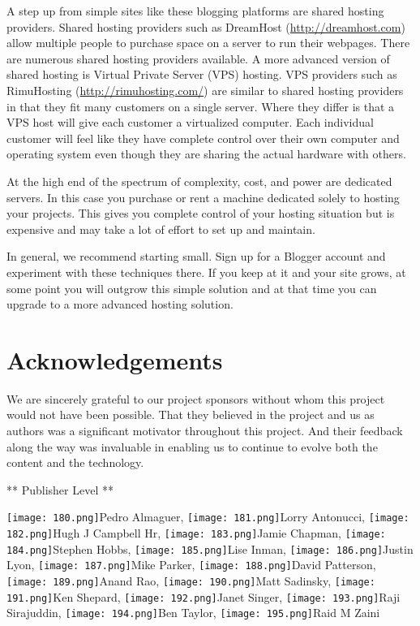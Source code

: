 \documentclass[]{memoir}
\let\Oldincludegraphics\includegraphics
\renewcommand{\includegraphics}[1]{\Oldincludegraphics[max size={\textwidth}{\textheight}]{#1}}
\begin{document}
A step up from simple sites like these blogging platforms are shared
hosting providers. Shared hosting providers such as DreamHost
(\url{http://dreamhost.com}) allow multiple people to purchase space on
a server to run their webpages. There are numerous shared hosting
providers available. A more advanced version of shared hosting is
Virtual Private Server (VPS) hosting. VPS providers such as RimuHosting
(\url{http://rimuhosting.com/}) are similar to shared hosting providers
in that they fit many customers on a single server. Where they differ is
that a VPS host will give each customer a virtualized computer. Each
individual customer will feel like they have complete control over their
own computer and operating system even though they are sharing the
actual hardware with others.

At the high end of the spectrum of complexity, cost, and power are
dedicated servers. In this case you purchase or rent a machine dedicated
solely to hosting your projects. This gives you complete control of your
hosting situation but is expensive and may take a lot of effort to set
up and maintain.

In general, we recommend starting small. Sign up for a Blogger account
and experiment with these techniques there. If you keep at it and your
site grows, at some point you will outgrow this simple solution and at
that time you can upgrade to a more advanced hosting solution.

\section{Acknowledgements}

We are sincerely grateful to our project sponsors without whom this
project would not have been possible. That they believed in the project
and us as authors was a significant motivator throughout this project.
And their feedback along the way was invaluable in enabling us to
continue to evolve both the content and the technology.

** Publisher Level **

\texttt{[image: 180.png]}Pedro Almaguer, \texttt{[image: 181.png]}Lorry
Antonucci, \texttt{[image: 182.png]}Hugh J Campbell Hr,
\texttt{[image: 183.png]}Jamie Chapman, \texttt{[image: 184.png]}Stephen
Hobbs, \texttt{[image: 185.png]}Lise Inman,
\texttt{[image: 186.png]}Justin Lyon, \texttt{[image: 187.png]}Mike
Parker, \texttt{[image: 188.png]}David Patterson,
\texttt{[image: 189.png]}Anand Rao, \texttt{[image: 190.png]}Matt
Sadinsky, \texttt{[image: 191.png]}Ken Shepard,
\texttt{[image: 192.png]}Janet Singer, \texttt{[image: 193.png]}Raji
Sirajuddin, \texttt{[image: 194.png]}Ben Taylor,
\texttt{[image: 195.png]}Raid M Zaini
\end{document}
